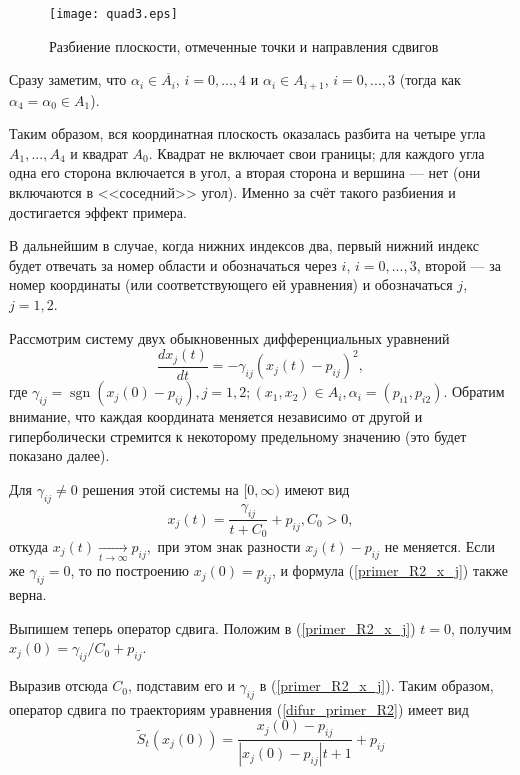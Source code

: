 \begin{figure}[h]
	\centering
	\texttt{[image: quad3.eps]}
	\caption{Разбиение плоскости, отмеченные точки и направления сдвигов}
	\label{fig:somelabel}
\end{figure}

Сразу заметим, что $\alpha_i \in \overline{A_i}$, $i=0,...,4$ и
$\alpha_i \in A_{i+1}$, $i=0,...,3$ (тогда как $\alpha_4 = \alpha_0 \in A_{1}$).

Таким образом, вся координатная плоскость оказалась разбита на четыре угла $A_1, ..., A_4$ и квадрат $A_0$.
Квадрат не включает свои границы; для каждого угла одна его сторона включается в угол,
а вторая сторона и вершина --- нет (они включаются в <<соседний>> угол).
Именно за счёт такого разбиения и достигается эффект примера.

В дальнейшим в случае, когда нижних индексов два, первый нижний индекс
будет отвечать за номер области и обозначаться через $i$,
$i=0, ..., 3$, второй --- за номер координаты
(или соответствующего ей уравнения) и обозначаться $j$, $j=1, 2$.

Рассмотрим систему двух обыкновенных дифференциальных уравнений
\begin{equation}\label{difur_primer_R2}
	\frac{dx_j(t)}{dt} = -\gamma_{ij}(x_j(t)-p_{ij})^2,
\end{equation}
где
$
	\gamma_{ij} = \operatorname{sgn}(x_j(0)-p_{ij}), j=1,2;
	(x_1, x_2) \in A_i,  \alpha_i = (p_{i1},p_{i2}).
$
Обратим внимание, что каждая координата меняется независимо от другой и гиперболически стремится
к некоторому предельному значению (это будет показано далее).

Для $\gamma_{ij} \neq 0$ решения этой системы на $[0, \infty)$ имеют вид
\begin{equation}\label{primer_R2_x_j}
	x_j(t) = \frac{\gamma_{ij}}{t+C_0}+p_{ij}, C_0 > 0,
\end{equation}
откуда
$
	x_j(t) \xrightarrow[t\to \infty ]{}{p_{ij}},
$
при этом знак разности $x_j(t) - p_{ij}$ не меняется.
Если же $\gamma_{ij}=0$, то по построению $x_j(0)=p_{ij}$,
и формула (\ref{primer_R2_x_j}) также верна.

Выпишем теперь оператор сдвига.
Положим в (\ref{primer_R2_x_j}) $t=0$, получим
$
	x_j(0) = \gamma_{ij}/{C_0}+p_{ij}
$.

Выразив отсюда $C_0$, подставим его и $\gamma_{ij}$ в (\ref{primer_R2_x_j}).
Таким образом, оператор сдвига по траекториям уравнения (\ref{difur_primer_R2}) имеет вид
\begin{equation}\label{primer_R2_oper_sdviga}
	\tilde{S}_t(x_{j}(0)) = \frac{x_{j}(0)-p_{ij}}{|x_{j}(0)-p_{ij}|t+1}+p_{ij}
\end{equation}


